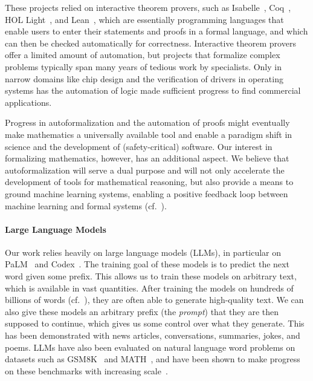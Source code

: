 \documentclass{article}
\begin{document}
These projects relied on interactive theorem provers, such as Isabelle~\citep{wenzel08isabelle}, Coq~\cite{coq}, HOL Light~\citep{Harrison96hollight}, and Lean~\citep{demoura2015lean}, which are essentially programming languages that enable users to enter their statements and proofs in a formal language, and which can then be checked automatically for correctness.
Interactive theorem provers offer a limited amount of automation, but projects that formalize complex problems typically span many years of tedious work by specialists. Only in narrow domains like chip design and the verification of drivers in operating systems has the automation of logic made sufficient progress to find commercial applications.





Progress in autoformalization and the automation of proofs might eventually make mathematics a universally available tool and enable a paradigm shift in science and the development of (safety-critical) software.
Our interest in formalizing mathematics, however, has an additional aspect.
We believe that autoformalization will serve a dual purpose and will not only accelerate the development of tools for mathematical reasoning, but also provide a means to ground machine learning systems, enabling a positive feedback loop between machine learning and formal systems (cf.~\cite{szegedy2020promisingpath}).


\paragraph{Large Language Models}
Our work relies heavily on large language models (LLMs), in particular on PaLM~\citep{chowdhery2022palm} and Codex~\citep{chen2021codex}.
The training goal of these models is to predict the next word given some prefix. This allows us to train these models on arbitrary text, which is available in vast quantities.
After training the models on hundreds of billions of words (cf.~\cite{hoffman2022chinchilla}), they are often able to generate high-quality text.
We can also give these models an arbitrary prefix (the \emph{prompt}) that they are then supposed to continue, which gives us some control over what they generate.
This has been demonstrated with news articles, conversations, summaries, jokes, and poems. LLMs have also been evaluated on natural language word problems on datasets such as GSM8K~\citep{cobbe2021trainingverifiers} and MATH~\citep{hendrycks2021math}, and have been shown to make progress on these benchmarks with increasing scale~\citep{chowdhery2022palm}.
\end{document}
